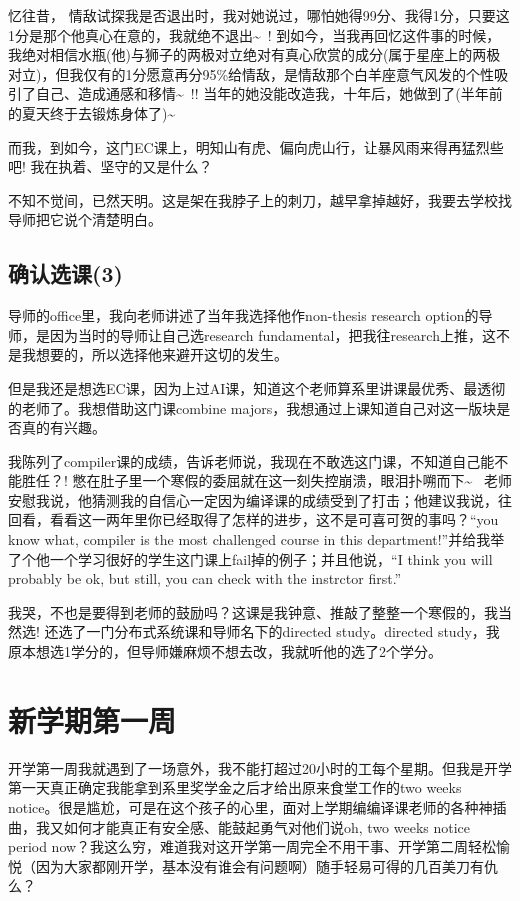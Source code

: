 \documentclass[12pt]{book}
\begin{document}
忆往昔， 情敌试探我是否退出时，我对她说过，哪怕她得99分、我得1分，只要这1分是那个他真心在意的，我就绝不退出\textasciitilde{}~! 到如今，当我再回忆这件事的时候，我绝对相信水瓶(他)与狮子的两极对立绝对有真心欣赏的成分(属于星座上的两极对立)，但我仅有的1分愿意再分95\%给情敌，是情敌那个白羊座意气风发的个性吸引了自己、造成通感和移情\textasciitilde{}~!! 当年的她没能改造我，十年后，她做到了(半年前的夏天终于去锻炼身体了)\textasciitilde{}~

而我，到如今，这门EC课上，明知山有虎、偏向虎山行，让暴风雨来得再猛烈些吧! 我在执着、坚守的又是什么？

不知不觉间，已然天明。这是架在我脖子上的刺刀，越早拿掉越好，我要去学校找导师把它说个清楚明白。

\section{确认选课(3)}
\label{sec-19-3}

导师的office里，我向老师讲述了当年我选择他作non-thesis research option的导师，是因为当时的导师让自己选research fundamental，把我往research上推，这不是我想要的，所以选择他来避开这切的发生。

但是我还是想选EC课，因为上过AI课，知道这个老师算系里讲课最优秀、最透彻的老师了。我想借助这门课combine majors，我想通过上课知道自己对这一版块是否真的有兴趣。

我陈列了compiler课的成绩，告诉老师说，我现在不敢选这门课，不知道自己能不能胜任？! 憋在肚子里一个寒假的委屈就在这一刻失控崩溃，眼泪扑嗍而下\textasciitilde{}~ 老师安慰我说，他猜测我的自信心一定因为编译课的成绩受到了打击；他建议我说，往回看，看看这一两年里你已经取得了怎样的进步，这不是可喜可贺的事吗？“you know what, compiler is the most challenged course in this department!”并给我举了个他一个学习很好的学生这门课上fail掉的例子；并且他说，“I think you will probably be ok, but still, you can check with the instrctor first.”

我哭，不也是要得到老师的鼓励吗？这课是我钟意、推敲了整整一个寒假的，我当然选! 还选了一门分布式系统课和导师名下的directed study。directed study，我原本想选1学分的，但导师嫌麻烦不想去改，我就听他的选了2个学分。

\chapter{新学期第一周}
\label{sec-20}

开学第一周我就遇到了一场意外，我不能打超过20小时的工每个星期。但我是开学第一天真正确定我能拿到系里奖学金之后才给出原来食堂工作的two weeks notice。很是尴尬，可是在这个孩子的心里，面对上学期编编译课老师的各种神插曲，我又如何才能真正有安全感、能鼓起勇气对他们说oh, two weeks notice period now？我这么穷，难道我对这开学第一周完全不用干事、开学第二周轻松愉悦（因为大家都刚开学，基本没有谁会有问题啊）随手轻易可得的几百美刀有仇么？
\end{document}
